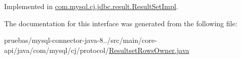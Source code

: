 Implemented in \mbox{\hyperlink{classcom_1_1mysql_1_1cj_1_1jdbc_1_1result_1_1_result_set_impl_a3dcbce7ef97301024277eb49d55fe26f}{com.\+mysql.\+cj.\+jdbc.\+result.\+Result\+Set\+Impl}}.



The documentation for this interface was generated from the following file\+:\begin{DoxyCompactItemize}
\item 
pruebas/mysql-\/connector-\/java-\/8../src/main/core-\/api/java/com/mysql/cj/protocol/\mbox{\hyperlink{_resultset_rows_owner_8java}{Resultset\+Rows\+Owner.\+java}}\end{DoxyCompactItemize}
